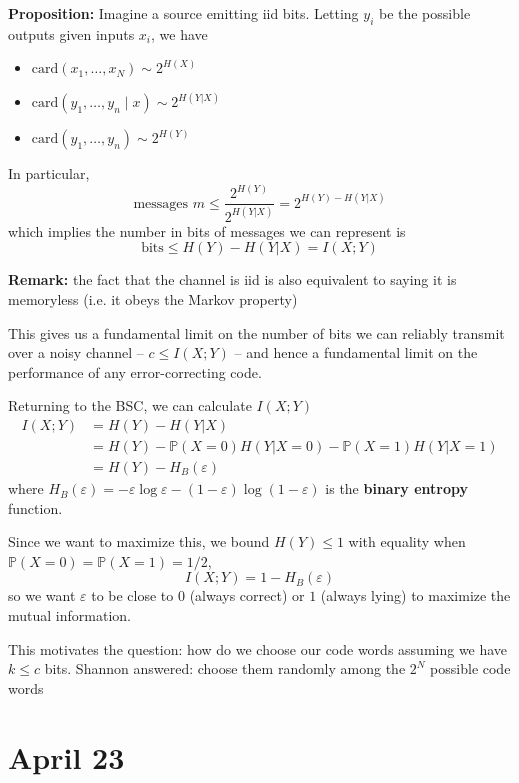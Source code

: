 \documentclass[12pt]{report}
\renewcommand{\P}{\mathbb{P}}
\newcommand{\ep}{\varepsilon}
\newcommand*{\tbf}[1]{\ifmmode\mathbf{#1}\else\textbf{#1}\fi}
\newenvironment*{proposition}[1][gray]{
    \begin{tcolorbox}[
        parbox=false,
        colback=#1!5!white,
        colframe=#1!75!black,
        breakable
    ]}
    {\end{tcolorbox}}
\begin{document}
\begin{proposition}
    \textbf{Proposition:} Imagine a source emitting iid bits. Letting $y_i$ be the possible outputs given inputs $x_i$, we have
    \begin{itemize}
        \item $\text{card}(x_1, \dots, x_N) \sim 2^{H(X)}$
        \item $\text{card}(y_1, \dots, y_n \;| \; x) \sim 2^{H(Y | X)}$
        \item $\text{card}(y_1, \dots, y_n) \sim 2^{H(Y)}$
    \end{itemize}

    In particular, 
    \[\text{messages } m \leq \frac{2^{H(Y)}}{2^{H(Y | X)}} = 2^{H(Y) - H(Y | X)}\]
    which implies the number in bits of messages we can represent is 
    \[\text{bits} \leq H(Y) - H(Y | X) = I(X; Y )\] 
\end{proposition}

\tbf{Remark:} the fact that the channel is iid is also equivalent to saying it is memoryless (i.e. it obeys the Markov property)

This gives us a fundamental limit on the number of bits we can reliably transmit over a noisy channel -- $c \leq I(X; Y)$ -- and hence a fundamental limit on the performance of any error-correcting code.

Returning to the BSC, we can calculate $I(X; Y)$ 
\begin{align*}
    I(X; Y) &= H(Y) - H(Y | X)\\ 
    &= H(Y) - \P(X = 0)H(Y | X = 0) - \P(X = 1)H(Y | X = 1)\\ 
    &= H(Y) - H_B(\ep)
\end{align*}
where $H_B(\ep) = -\ep \log \ep - (1 - \ep) \log (1 - \ep)$ is the \tbf{binary entropy} function.

Since we want to maximize this, we bound $H(Y) \leq 1$ with equality when $\P(X = 0) = \P(X = 1) = 1/2$, 
\[I(X; Y) = 1 - H_B(\ep) \]
so we want $\ep$ to be close to $0$ (always correct) or $1$ (always lying) to maximize the mutual information.

This motivates the question: how do we choose our code words assuming we have $k \leq c$ bits. Shannon answered: choose them randomly among the $2^N$ possible code words 

\section{April 23}
\end{document}
